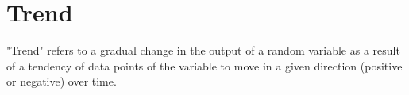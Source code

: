 \chapter{Trend}
"Trend" refers to a gradual change in the output of a random variable as a result of a tendency of data points of the variable to move in a given direction (positive or negative) over time. 